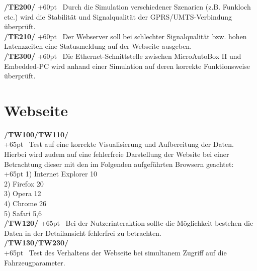 \documentclass[fontsize = 12pt, paper = a4]{scrreprt}
\begin{document}
\textbf{/TE200/} 
\hangindent+60pt 
\ Durch die Simulation verschiedener Szenarien (z.B. Funkloch etc.) wird die Stabilität und Signalqualität der \gls{GPRS}/\gls{UMTS}-Verbindung überprüft. \\

\textbf{/TE210/} 
\hangindent+60pt 
\ Der Webserver soll bei schlechter Signalqualität bzw. hohen \gls{Latenz}zeiten eine Statusmeldung auf der Webseite ausgeben. \\

\textbf{/TE300/} 
\hangindent+60pt 
\ Die \gls{Ethernet}-Schnittstelle zwischen \gls{MicroAutoBox II} und \gls{Embedded-PC} wird anhand einer Simulation auf deren korrekte Funktionsweise überprüft.  \\

\newpage


\section{Webseite}

\textbf{/TW100/TW110/} \\
\hangindent+65pt 
 \ Test auf eine korrekte Visualisierung  und Aufbereitung der Daten. \\ Hierbei wird zudem auf eine fehlerfreie Darstellung der Website bei einer Betrachtung dieser mit den im Folgenden aufgeführten \gls{Browser}n geachtet: \\
 
 \hangindent+65pt 
 1) Internet Explorer 10 \\
 2) Firefox 20 \\
 3) Opera 12 \\
 4) Chrome 26 \\
 5) Safari 5,6 \\
  

\textbf{/TW120/} 
\hangindent+65pt 
\ Bei der Nutzerinteraktion sollte die Möglichkeit bestehen die Daten in der Detailansicht fehlerfrei zu betrachten. \\

\textbf{/TW130/TW230/} \\
\hangindent+65pt 
\ Test des Verhaltens der Webseite bei simultanem Zugriff auf die Fahrzeugparameter. \\ %
\end{document}
